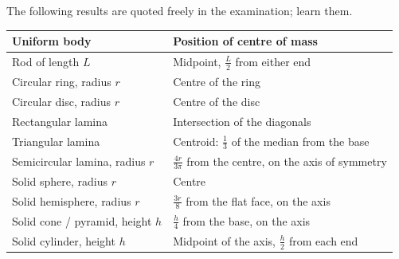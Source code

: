 \documentclass[11pt]{article}
\begin{document}
\begin{propriete}
The following results are quoted freely in the examination; learn them.
\begin{center}
\begin{tabularx}{\linewidth}{|l|X|}
\hline
\rowcolor{popblueL}\textbf{Uniform body} & \textbf{Position of centre of mass} \\
\hline
Rod of length $L$ & Midpoint, $\frac{L}{2}$ from either end \\
Circular ring, radius $r$ & Centre of the ring \\
Circular disc, radius $r$ & Centre of the disc \\
Rectangular lamina & Intersection of the diagonals \\
Triangular lamina & Centroid: $\frac{1}{3}$ of the median from the base \\
Semicircular lamina, radius $r$ & $\frac{4r}{3\pi}$ from the centre, on the axis of symmetry \\
Solid sphere, radius $r$ & Centre \\
Solid hemisphere, radius $r$ & $\frac{3r}{8}$ from the flat face, on the axis \\
Solid cone / pyramid, height $h$ & $\frac{h}{4}$ from the base, on the axis \\
Solid cylinder, height $h$ & Midpoint of the axis, $\frac{h}{2}$ from each end \\
\hline
\end{tabularx}
\end{center}
\end{propriete}
\end{document}
